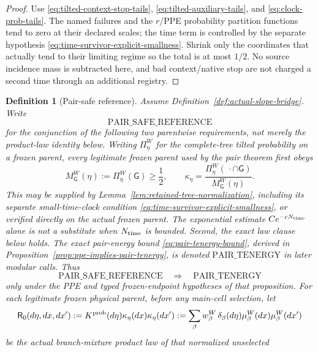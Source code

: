 \documentclass[11pt]{article}
\newtheorem{definition}[theorem]{Definition}
\begin{document}
\begin{proof}
Use \eqref{eq:tilted-context-stop-tails},
\eqref{eq:tilted-auxiliary-tails}, and
\eqref{eq:clock-prob-tails}.  The named failures and the $r$/PPE probability
partition functions tend to zero at their declared scales; the time term is
controlled by the separate hypothesis
\eqref{eq:time-survivor-explicit-smallness}.  Shrink only the coordinates
that actually tend to their limiting regime so the total is at most $1/2$.
No source
incidence mass is subtracted here, and bad context/native stop are not
charged a second time through an additional registry.
\end{proof}

\begin{definition}[Pair-safe reference]
\label{def:pair-safe-reference}
Assume Definition~\ref{def:actual-slope-bridge}.  Write
\[
 \mathrm{PAIR\_SAFE\_REFERENCE}
\]
for the conjunction of the following two parentwise requirements, not merely
the product-law identity below.
Writing $\Pi_\eta^W$ for the complete-tree tilted probability on a frozen
parent, every legitimate frozen parent used by the pair theorem first obeys
\begin{equation}
\label{eq:pair-safe-parentwise-survivor-floor}
 M_{\mathsf G}^{W}(\eta):=\Pi_\eta^W(\mathsf G)\ge\frac12,
 \qquad
 \kappa_\eta=
 \frac{\Pi_{\eta}^{W}(\,\cdot\cap\mathsf G)}
      {M_{\mathsf G}^{W}(\eta)}.
\end{equation}
This may be supplied by Lemma~\ref{lem:retained-tree-normalization}, including
its separate small-time-clock condition
\eqref{eq:time-survivor-explicit-smallness}, or verified directly on the
actual frozen parent.  The exponential estimate $Ce^{-cN_{\rm time}}$ alone
is not a substitute when $N_{\rm time}$ is bounded.  Second, the exact law
clause below holds.  The exact pair-energy bound
\eqref{eq:pair-tenergy-bound}, derived in
Proposition~\ref{prop:ppe-implies-pair-tenergy}, is denoted
\(\mathrm{PAIR\_TENERGY}\) in later modular calls.  Thus
\[
 \mathrm{PAIR\_SAFE\_REFERENCE}\quad\Longrightarrow\quad
 \mathrm{PAIR\_TENERGY}
\]
only under the PPE and typed frozen-endpoint hypotheses of that proposition.
For each
legitimate frozen physical parent, before
any main-cell selection, let
\begin{equation}
\label{eq:unselected-reference-law}
 \mathsf R_0(d\eta,dx,dx')
 :=K^{\rm prob}(d\eta)\kappa_\eta(dx)\kappa_\eta(dx')
 :=\sum_\beta w_\beta^W\,
   \delta_\beta(d\eta)\mu_\beta^W(dx)\mu_\beta^W(dx')
\end{equation}
be the actual branch-mixture product law of that normalized unselected

\end{definition}
\end{document}
